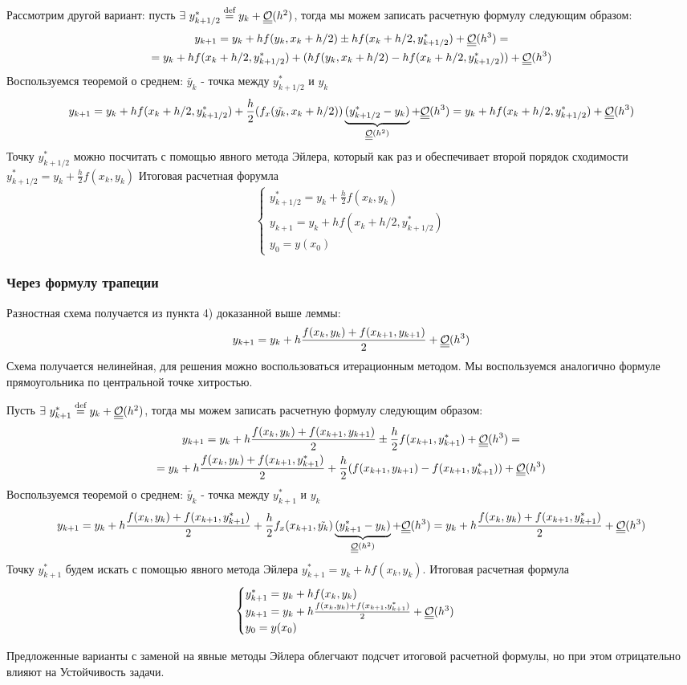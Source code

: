 Рассмотрим другой вариант: пусть $\exists\ y_{k+1/2}^*\defeq y_k+\bigO(h^2)$, тогда
мы можем записать расчетную формулу следующим образом:
\begin{multline*}
  y_{k+1}=y_{k}+hf(y_k, x_k+h/2)\pm hf(x_k+h/2,y_{k+1/2}^*)+\underline{\underline{\mathcal{O}}}(h^3)= \\
  = y_{k}+hf(x_k+h/2,y_{k+1/2}^*)+ (hf(y_k, x_k+h/2)-hf(x_k+h/2,y_{k+1/2}^*))+\underline{\underline{\mathcal{O}}}(h^3)
\end{multline*}
Воспользуемся теоремой о среднем: $\tilde{y_k}$ - точка между $y_{k+1/2}^*$ и $y_k$
\[y_{k+1}= y_{k}+hf(x_k+h/2,y_{k+1/2}^*)+ \frac{h}{2}(f_x(\tilde{y_k}, x_k+h/2))\underbrace{(y_{k+1/2}^*-y_k)}_{\underline{\underline{\mathcal{O}}}(h^2)}+\underline{\underline{\mathcal{O}}}(h^3)=y_{k}+hf(x_k+h/2,y_{k+1/2}^*)+\underline{\underline{\mathcal{O}}}(h^3)\]
Точку $y_{k+1/2}^*$ можно посчитать с помощью явного метода Эйлера,
который как раз и обеспечивает второй порядок сходимости $y_{k+1/2}^*=y_k+\frac{h}{2}f(x_k,y_k)$
Итоговая расчетная форумла
\[\begin{cases}
    y_{k+1/2}^*=y_k+\frac{h}{2}f(x_k,y_k) \\
    y_{k+1}=y_{k}+hf(x_k+h/2,y_{k+1/2}^*) \\
    y_0=y(x_0)
  \end{cases}\]

\subsubsection*{Через формулу трапеции}
Разностная схема получается из пункта 4) доказанной выше леммы:
\[y_{k+1}=y_k+h\frac{f(x_k,y_k)+f(x_{k+1},y_{k+1})}{2}+\underline{\underline{\mathcal{O}}}(h^3)\]
Схема получается нелинейная, для решения можно воспользоваться итерационным
методом. Мы воспользуемся аналогично формуле прямоугольника по центральной
точке хитростью.

Пусть $\exists\ y_{k+1}^*\stackrel{\text{def}}{=} y_k+\underline{\underline{\mathcal{O}}}(h^2)$, тогда
мы можем записать расчетную формулу следующим образом:
\begin{multline*}
  y_{k+1}=y_k+h\frac{f(x_k,y_k)+f(x_{k+1},y_{k+1})}{2}\pm\frac{h}{2}f(x_{k+1},y_{k+1}^*)+\underline{\underline{\mathcal{O}}}(h^3)= \\
  = y_k+h\frac{f(x_k,y_k)+f(x_{k+1},y_{k+1}^*)}{2}+\frac{h}{2}(f(x_{k+1},y_{k+1})-f(x_{k+1},y_{k+1}^*))+\underline{\underline{\mathcal{O}}}(h^3)
\end{multline*}
Воспользуемся теоремой о среднем: $\tilde{y_k}$ - точка между $y_{k+1}^*$ и $y_k$
\[y_{k+1}=y_k+h\frac{f(x_k,y_k)+f(x_{k+1},y_{k+1}^*)}{2}+\frac{h}{2}f_x(x_{k+1},\tilde{y_k})\underbrace{(y_{k+1}^*-y_k)}_{\underline{\underline{\mathcal{O}}}(h^2)}+\underline{\underline{\mathcal{O}}}(h^3)=y_k+h\frac{f(x_k,y_k)+f(x_{k+1},y_{k+1}^*)}{2}+\underline{\underline{\mathcal{O}}}(h^3)\]
Точку $y_{k+1}^*$ будем искать с помощью явного метода Эйлера $y_{k+1}^*=y_k+hf(x_k,y_k)$.
Итоговая расчетная формула
\[\begin{cases}
    y_{k+1}^*=y_k+hf(x_k,y_k)                                         \\
    y_{k+1}=y_k+h\frac{f(x_k,y_k)+f(x_{k+1},y_{k+1}^*)}{2}+\underline{\underline{\mathcal{O}}}(h^3) \\
    y_0=y(x_0)
  \end{cases}\]
\begin{remark}
  Предложенные варианты с заменой на явные методы Эйлера облегчают
  подсчет итоговой расчетной формулы, но при этом отрицательно влияют на Устойчивость
  задачи.
\end{remark}
